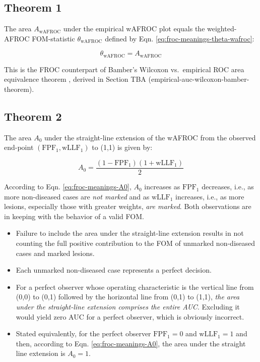 \documentclass[
]{book}
\providecommand{\tightlist}{%
  \setlength{\itemsep}{0pt}\setlength{\parskip}{0pt}}
\begin{document}
\hypertarget{froc-meanings-two-theorems-1}{%
\subsection{Theorem 1}\label{froc-meanings-two-theorems-1}}

The area \(A_{\text{wAFROC}}\) under the empirical wAFROC plot equals the weighted-AFROC FOM-statistic \(\theta_{\text{wAFROC}}\) defined by Eqn. \eqref{eq:froc-meanings-theta-wafroc}:

\begin{equation}
\theta_{\text{wAFROC}} = A_{\text{wAFROC}}
\label{eq:froc-meanings-theorem1}
\end{equation}

This is the FROC counterpart of Bamber's Wilcoxon vs.~empirical ROC area equivalence theorem \citep{RN2174}, derived in Section TBA (empirical-auc-wilcoxon-bamber-theorem).

\hypertarget{froc-meanings-two-theorems-2}{%
\subsection{Theorem 2}\label{froc-meanings-two-theorems-2}}

The area \(A_0\) under the straight-line extension of the wAFROC from the observed end-point \(\left ( \text{FPF}_1, \text{wLLF}_1 \right )\) to (1,1) is given by:

\begin{equation}
A_0 = \frac{\left ( 1 - \text{FPF}_1 \right )\left ( 1 + \text{wLLF}_1 \right )}{2}
\label{eq:froc-meanings-A0}
\end{equation}

According to Eqn. \eqref{eq:froc-meanings-A0}, \(A_0\) increases as \(\text{FPF}_1\) decreases, i.e., as more non-diseased cases are \emph{not marked} and as \(\text{wLLF}_1\) increases, i.e., as more lesions, especially those with greater weights, \emph{are marked}. Both observations are in keeping with the behavior of a valid FOM.

\begin{itemize}
\tightlist
\item
  Failure to include the area under the straight-line extension results in not counting the full positive contribution to the FOM of unmarked non-diseased cases and marked lesions.
\item
  Each unmarked non-diseased case represents a perfect decision.
\item
  For a perfect observer whose operating characteristic is the vertical line from (0,0) to (0,1) followed by the horizontal line from (0,1) to (1,1), \emph{the area under the straight-line extension comprises the entire AUC}. Excluding it would yield zero AUC for a perfect observer, which is obviously incorrect.
\item
  Stated equivalently, for the perfect observer \(\text{FPF}_1 = 0\) and \(\text{wLLF}_1 = 1\) and then, according to Eqn. \eqref{eq:froc-meanings-A0}, the area under the straight line extension is \(A_0 = 1\).
\end{itemize}
\end{document}
